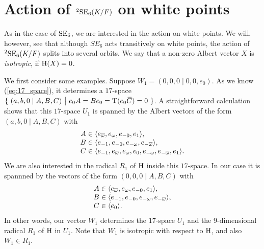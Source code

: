 \section{Action of ${}^2\mathrm{SE}_6(K/F)$ on white points}

As in the case of $\mathrm{SE}_6$, we are interested in the action on white points. We will, however, see 
that although $SE_6$ acts transitively on white points, the action of ${}^2\mathrm{SE}_6(K/F)$ splits
into several orbits. We say that a non-zero Albert vector $X$ is \textit{isotropic}, if
$\mathrm{H}(X) = 0$. 

We first consider some examples. Suppose $W_1 = (0,0,0\mid 0,0,e_0)$. As we know (\ref{eq:17_space}), 
it determines 
a $17$-space $	\{\ (a,b,0 \mid A,B,C)\ \big|\ e_0 A = B e_0 = \operatorname{T}(e_0 \mathord{\mbox{\hspace*{0pt}}\,\overline{\!C\!\!\;}\!\:}\mbox{\hspace*{0pt}}) = 0\ \}$. A
straightforward calculation shows that
this $17$-space $U_1$ is spanned by the Albert vectors of the form \mbox{$(a,b,0\mid A,B,C)$} with
\begin{equation}
	\begin{array}{r@{\;}c@{\;}l}
		A & \in & \langle e_{\bar{\omega}}, e_{\omega}, e_{-0}, e_1 \rangle, \\
		B & \in & \langle e_{-1}, e_{-0}, e_{-\omega}, e_{-\bar{\omega}} \rangle, \\
		C & \in & \langle e_{-1}, e_{\bar{\omega}}, e_{\omega}, e_0, e_{-\omega}, e_{-\bar{\omega}}, e_1
		\rangle.
	\end{array}
\end{equation}
We are also interested in the radical $R_1$ of $\mathrm{H}$ inside this $17$-space. In our case it is spannned
by the vectors of the form \mbox{$(0,0,0\mid A,B,C)$} with
\begin{equation}
	\begin{array}{r@{\;}c@{\;}l}
		A & \in & \langle e_{\bar{\omega}}, e_{\omega}, e_{-0}, e_1 \rangle, \\
		B & \in & \langle e_{-1}, e_{-0}, e_{-\omega}, e_{-\bar{\omega}} \rangle, \\
		C & \in & \langle e_0 \rangle.
	\end{array}
\end{equation}
In other words, our vector $W_1$ determines the $17$-space $U_1$ and the $9$-dimensional radical $R_1$ 
of $\mathrm{H}$ in $U_1$. Note that $W_1$ is isotropic with respect to $\mathrm{H}$, and also $W_1 \in R_1$. 

